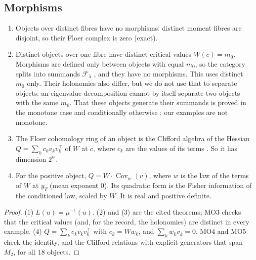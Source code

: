 \documentclass[11pt]{article}
\theoremstyle{definition}\newtheorem{definition}[theorem]{Definition}\newtheorem{remark}[theorem]{Remark}\newtheorem{example}[theorem]{Example}\newtheorem{problem}[theorem]{Open problem}\crefname{problem}{Problem}{Problems}
\begin{document}
\subsection{Morphisms}
\begin{proposition}\label{prop:morph}
\begin{enumerate}
\item[(1)] Objects over distinct fibres have no morphisms: distinct moment fibres are disjoint, so their Floer complex is zero (exact).
\item[(2)] Distinct objects over one fibre have distinct critical values $W(c)=m_0$. Morphisms are defined only between objects with equal $m_0$, so the category splits into summands $\mathcal F_\lambda$
  \cite{Auroux2007,FOOO2010}, and they have no morphisms. This uses distinct $m_0$ only. Their holonomies also differ, but we do not use that to separate objects: an
  eigenvalue decomposition cannot by itself separate two objects with the same $m_0$. That these objects generate their summands is proved in the monotone case and conditionally otherwise \cite{Smith2018}; our examples are not monotone.
\item[(3)] The Floer cohomology ring of an object is the Clifford algebra of the Hessian $Q=\sum_kc_kv_kv_k^{\!\top}$ of $W$ at $c$, where $c_k$ are the values of its terms \cite[Thm.~5.6]{Cho2005}.
  So it has dimension $2^n$.
\item[(4)] For the positive object, $Q=W\cdot\operatorname{Cov}_w(v)$, where $w$ is the law of the terms of $W$ at $y_T$ (mean exponent $0$). Its quadratic form is the Fisher information of the conditioned law,
  scaled by $W$. It is real and positive definite.
\end{enumerate}
\end{proposition}

\begin{proof}
(1) $L(u)=\mu^{-1}(u)$. (2) and (3) are the cited theorems; MO3 checks that the critical values (and, for the record, the holonomies) are distinct in every example. (4) $Q=\sum_kc_kv_kv_k^{\!\top}$ with $c_k=Ww_k$,
and $\sum_kw_kv_k=0$. MO4 and MO5 check the identity, and the Clifford relations with explicit generators that span $M_2$, for all $18$ objects.
\end{proof}
\end{document}
